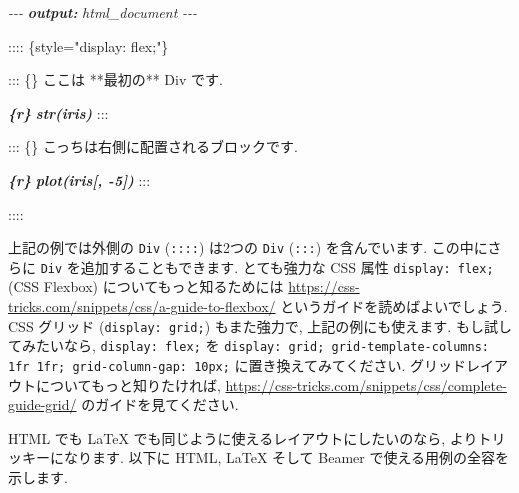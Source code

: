 \documentclass[
  11pt,
  lualatex,
  ja=standard]{bxjsreport}
\newenvironment{Shaded}{\begin{snugshade}}{\end{snugshade}}
\newcommand{\AnnotationTok}[1]{\textcolor[rgb]{0.56,0.35,0.01}{\textbf{\textit{#1}}}}
\newcommand{\CommentTok}[1]{\textcolor[rgb]{0.56,0.35,0.01}{\textit{#1}}}
\newcommand{\InformationTok}[1]{\textcolor[rgb]{0.56,0.35,0.01}{\textbf{\textit{#1}}}}
\newcommand{\NormalTok}[1]{#1}
\begin{document}
\begin{Shaded}
\begin{Highlighting}[]
\CommentTok{{-}{-}{-}}
\AnnotationTok{output:}\CommentTok{ html\_document}
\CommentTok{{-}{-}{-}}

\NormalTok{:::: \{style="display: flex;"\}}

\NormalTok{::: \{\}}
\NormalTok{ここは **最初の** Div です.}

\InformationTok{\textasciigrave{}\textasciigrave{}\textasciigrave{}\{r\}}
\InformationTok{str(iris)}
\InformationTok{\textasciigrave{}\textasciigrave{}\textasciigrave{}}
\NormalTok{:::}

\NormalTok{::: \{\}}
\NormalTok{こっちは右側に配置されるブロックです.}

\InformationTok{\textasciigrave{}\textasciigrave{}\textasciigrave{}\{r\}}
\InformationTok{plot(iris[, {-}5])}
\InformationTok{\textasciigrave{}\textasciigrave{}\textasciigrave{}}
\NormalTok{:::}

\NormalTok{::::}
\end{Highlighting}
\end{Shaded}

上記の例では外側の \texttt{Div} (\texttt{::::}) は2つの \texttt{Div} (\texttt{:::}) を含んでいます. この中にさらに \texttt{Div} を追加することもできます. とても強力な CSS 属性 \texttt{display: flex;} (CSS Flexbox) についてもっと知るためには \url{https://css-tricks.com/snippets/css/a-guide-to-flexbox/} というガイドを読めばよいでしょう. CSS グリッド (\texttt{display: grid;}) もまた強力で, 上記の例にも使えます. もし試してみたいなら, \texttt{display: flex;} を \texttt{display: grid; grid-template-columns: 1fr 1fr; grid-column-gap: 10px;} に置き換えてみてください. グリッドレイアウトについてもっと知りたければ, \url{https://css-tricks.com/snippets/css/complete-guide-grid/} のガイドを見てください.

HTML でも LaTeX でも同じように使えるレイアウトにしたいのなら, よりトリッキーになります. 以下に HTML, LaTeX そして Beamer で使える用例の全容を示します.
\end{document}
